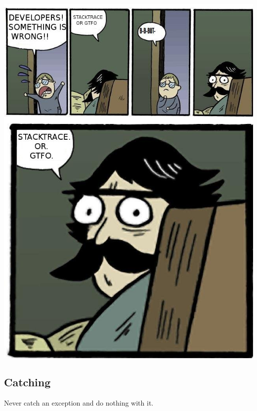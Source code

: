 \documentclass {amsart}
\begin{document}
	\includegraphics[scale=.45]{StackTrace.jpg}
	\subsection{Catching}  Never catch an exception and do nothing with it.  
\end{document}
